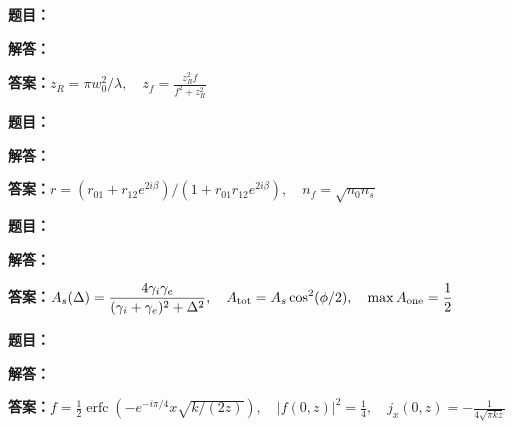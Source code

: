 \documentclass[lang=cn,color=blue,11pt]{elegantbook}
\begin{document}
\par
\noindent\textbf{题目：}
\par\noindent\textbf{解答：}
\par\noindent\textbf{答案：}\(\displaystyle z_R=\pi w_0^2/\lambda,\quad z_f=\frac{z_R^2f}{f^2+z_R^2}\)\par
\par\smallskip\noindent\hrulefill\par\medskip
{}\par
\noindent\textbf{题目：}
\par\noindent\textbf{解答：}
\par\noindent\textbf{答案：}\(\displaystyle r=(r_{01}+r_{12}e^{2i\beta})/(1+r_{01}r_{12}e^{2i\beta}),\quad n_f=\sqrt{n_0n_s}\)\par
\par\smallskip\noindent\hrulefill\par\medskip
{}\par
\noindent\textbf{题目：}
\par\noindent\textbf{解答：}
\par\noindent\textbf{答案：}\(\displaystyle A_s(\Delta)=\frac{4\gamma_i\gamma_e}{(\gamma_i+\gamma_e)^2+\Delta^2},\quad A_{\rm tot}=A_s\cos^2(\phi/2),\quad \max A_{\rm one}=\frac12\)\par
\par\smallskip\noindent\hrulefill\par\medskip
{}\par
\noindent\textbf{题目：}
\par\noindent\textbf{解答：}
\par\noindent\textbf{答案：}\(\displaystyle f=\frac12\operatorname{erfc}(-e^{-i\pi/4}x\sqrt{k/(2z)}),\quad |f(0,z)|^2=\frac14,\quad j_x(0,z)=-\frac{1}{4\sqrt{\pi kz}}\)\par
\end{document}
